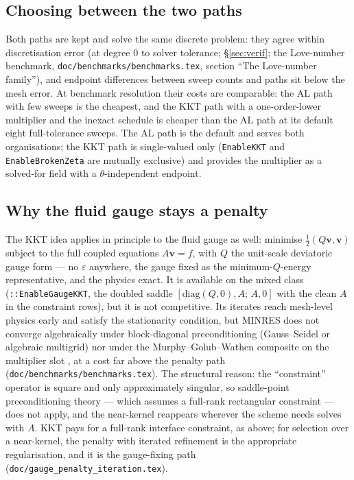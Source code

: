 \documentclass[11pt]{article}
\newcommand{\eps}{\varepsilon}
\newcommand{\bv}{\mathbf{v}}
\begin{document}
\subsection{Choosing between the two paths}

Both paths are kept and solve the same discrete problem: they agree
within discretisation error (at degree 0 to solver tolerance;
\S\ref{sec:verif}; the Love-number benchmark, \texttt{doc/benchmarks/benchmarks.tex},
section ``The Love-number family''), and endpoint differences between
sweep counts and paths sit below the mesh error. At benchmark
resolution their costs are comparable: the AL path with few sweeps is
the cheapest, and the KKT path with a one-order-lower multiplier and the
inexact schedule is cheaper than the AL path at its default eight
full-tolerance sweeps. The AL path is the default and serves both
organisations; the KKT path is single-valued only (\texttt{EnableKKT}
and \texttt{EnableBrokenZeta} are mutually exclusive) and provides the
multiplier as a solved-for field with a $\theta$-independent endpoint.

\subsection{Why the fluid gauge stays a penalty}
\label{sec:gaugekkt}

The KKT idea applies in principle to the fluid gauge as well: minimise
$\tfrac12 (Q\bv, \bv)$ subject to the full coupled equations
$A\bv = f$, with $Q$ the unit-scale deviatoric gauge form --- no $\eps$
anywhere, the gauge fixed as the minimum-$Q$-energy representative, and
the physics exact. It is available on the mixed class
(\texttt{::EnableGaugeKKT},
the doubled saddle $[\mathrm{diag}(Q,0), A;\, A, 0]$ with the clean $A$
in the constraint rows), but it is not competitive. Its iterates reach
mesh-level physics early and satisfy the stationarity condition, but
MINRES does not converge algebraically under block-diagonal
preconditioning (Gauss--Seidel or algebraic multigrid) nor under the
Murphy--Golub--Wathen composite on the multiplier slot
\cite{MurphyGolubWathen2000}, at a cost far above the penalty path
(\texttt{doc/benchmarks/benchmarks.tex}). The structural reason: the
``constraint'' operator is square and only approximately singular, so
saddle-point preconditioning theory --- which assumes a full-rank
rectangular constraint --- does not apply, and the near-kernel
reappears wherever the scheme needs solves with $A$. KKT pays for a
full-rank interface constraint, as above; for selection over a
near-kernel, the penalty with iterated refinement is the appropriate
regularisation, and it is the gauge-fixing path
(\texttt{doc/gauge\_penalty\_iteration.tex}).
\end{document}
